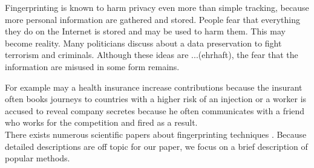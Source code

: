 			Fingerprinting is known to harm privacy even more than simple tracking, because more personal information are gathered and stored. People fear that everything they do on the Internet is stored and may be used to harm them. This may become reality. Many politicians discuss about a data preservation to fight terrorism and criminals. Although these ideas are ...(ehrhaft), the fear that the information are misused in some form remains. %
			
			For example may a health insurance increase contributions because the insurant often books journeys to countries with a higher risk of an injection or a worker is accused to reveal company secretes because he often communicates with a friend who works for the competition and fired as a result. \\
			
			
			
			
			There exists numerous scientific papers about fingerprinting techniques \cite{paulstone_historysniffing, MBYS11, Nikiforakis:2013:CME:2497621.2498133, Eckersley:2010:UYW:1881151.1881152, MS12, olejnik:hal-00747841}. Because detailed descriptions are off topic for our paper, we focus on a brief description of popular methods. %
			
